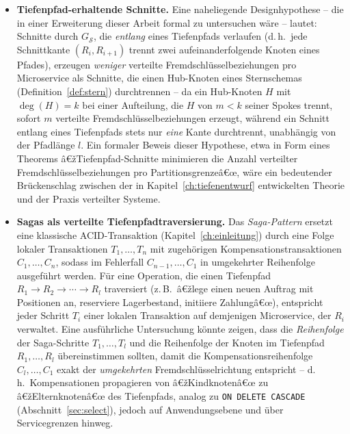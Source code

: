 ﻿\documentclass[a4paper,12pt]{report}
\theoremstyle{definition}
\theoremstyle{remark}
\begin{document}
\begin{itemize}
  \item \textbf{Tiefenpfad-erhaltende Schnitte.} Eine naheliegende
    Designhypothese -- die in einer Erweiterung dieser Arbeit formal
    zu untersuchen wäre -- lautet: Schnitte durch
    $G_{\mathcal{S}}$, die \emph{entlang} eines Tiefenpfads verlaufen
    (d.\,h.\ jede Schnittkante $(R_i,R_{i+1})$ trennt zwei
    aufeinanderfolgende Knoten eines Pfades), erzeugen
    \emph{weniger} verteilte Fremdschlüsselbeziehungen pro
    Microservice als Schnitte, die einen Hub-Knoten eines
    Sternschemas (Definition~\ref{def:stern}) durchtrennen -- da ein
    Hub-Knoten $H$ mit $\deg(H)=k$ bei einer Aufteilung, die $H$ von
    $m<k$ seiner Spokes trennt, sofort $m$ verteilte
    Fremdschlüsselbeziehungen erzeugt, während ein Schnitt entlang
    eines Tiefenpfads stets nur \emph{eine} Kante durchtrennt,
    unabhängig von der Pfadlänge $l$. Ein formaler Beweis dieser
    Hypothese, etwa in Form eines Theorems
    â€žTiefenpfad-Schnitte minimieren die Anzahl verteilter
    Fremdschlüsselbeziehungen pro Partitionsgrenzeâ€œ, wäre ein
    bedeutender Brückenschlag zwischen der in
    Kapitel~\ref{ch:tiefenentwurf} entwickelten Theorie und der
    Praxis verteilter Systeme.

  \item \textbf{Sagas als verteilte Tiefenpfadtraversierung.} Das
    \emph{Saga-Pattern} ersetzt eine klassische ACID-Transaktion
    (Kapitel~\ref{ch:einleitung}) durch eine Folge lokaler
    Transaktionen $T_1,\ldots,T_n$ mit zugehörigen
    Kompensationstransaktionen $C_1,\ldots,C_n$, sodass im Fehlerfall
    $C_{n-1},\ldots,C_1$ in umgekehrter Reihenfolge ausgeführt
    werden. Für eine Operation, die einen Tiefenpfad
    $R_1\to R_2\to\cdots\to R_l$ traversiert (z.\,B.\ â€žlege einen
    neuen Auftrag mit Positionen an, reserviere Lagerbestand,
    initiiere Zahlungâ€œ), entspricht jeder Schritt $T_i$ einer
    lokalen Transaktion auf demjenigen Microservice, der $R_i$
    verwaltet. Eine ausführliche Untersuchung könnte zeigen, dass die
    \emph{Reihenfolge} der Saga-Schritte $T_1,\ldots,T_l$ und die
    Reihenfolge der Knoten im Tiefenpfad $R_1,\ldots,R_l$
    übereinstimmen sollten, damit die Kompensationsreihenfolge
    $C_l,\ldots,C_1$ exakt der \emph{umgekehrten}
    Fremdschlüsselrichtung entspricht -- d.\,h.\ Kompensationen
    propagieren von â€žKindknotenâ€œ zu â€žElternknotenâ€œ des Tiefenpfads,
    analog zu \texttt{ON DELETE CASCADE} (Abschnitt~\ref{sec:select}),
    jedoch auf Anwendungsebene und über Servicegrenzen hinweg.


\end{itemize}
\end{document}
